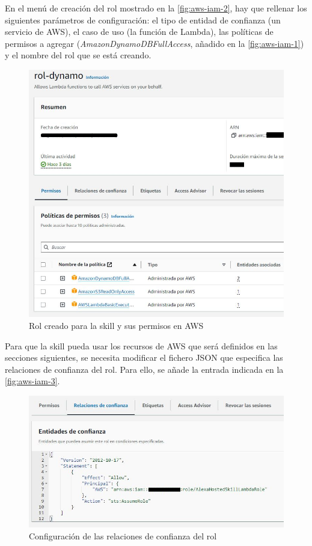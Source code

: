 En el menú de creación del rol mostrado en la \autoref{fig:aws-iam-2}, hay que rellenar los siguientes parámetros de configuración: el tipo de entidad de confianza (un servicio de AWS), el caso de uso (la función de Lambda), las políticas de permisos a agregar (\textit{AmazonDynamoDBFullAccess}, añadido en la \autoref{fig:aws-iam-1}) y el nombre del rol que se está creando.

\begin{figure}[H]
	\centering
	\includegraphics[width=1\textwidth]{imgs/aws-iam-1.png}
	\caption{Rol creado para la skill y sus permisos en AWS}
	\label{fig:aws-iam-1}
\end{figure}

Para que la skill pueda usar los recursos de AWS que será definidos en las secciones siguientes, se necesita modificar el fichero JSON que especifica las relaciones de confianza del rol. Para ello, se añade la entrada indicada en la \autoref{fig:aws-iam-3}.

\begin{figure}[H]
	\centering
	\includegraphics[width=1\textwidth]{imgs/aws-iam-3.png}
	\caption{Configuración de las relaciones de confianza del rol}
	\label{fig:aws-iam-3}
\end{figure}

